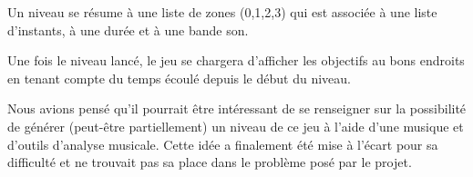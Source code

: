 Un niveau se résume à une liste de zones (0,1,2,3) qui est associée à une liste d'instants, à une durée et à une bande son.

Une fois le niveau lancé, le jeu se chargera d'afficher les objectifs au bons endroits en tenant compte du temps écoulé depuis le début du niveau.

Nous avions pensé qu'il pourrait être intéressant de se renseigner sur la possibilité de générer (peut-être partiellement) un niveau de ce jeu à l'aide d'une musique et d'outils d'analyse musicale. Cette idée a finalement été mise à l'écart pour sa difficulté et ne trouvait pas sa place dans le problème posé par le projet.

